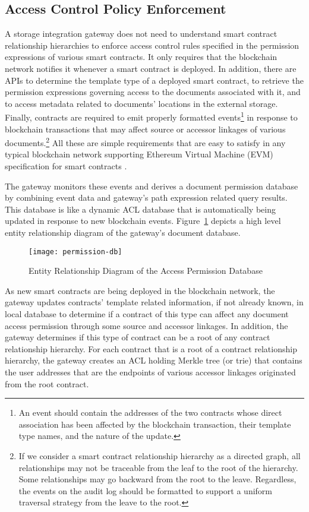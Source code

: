 \subsection{Access Control Policy Enforcement}
A storage integration gateway does not need to understand smart contract relationship hierarchies to enforce access control rules specified in the permission expressions of various smart contracts. It only requires that the blockchain network notifies it whenever a smart contract is deployed. In addition, there are APIs to determine the template type of a deployed smart contract, to retrieve the permission expressions governing access to the documents associated with it, and to access metadata related to documents' locations in the external storage. Finally, contracts are required to emit properly formatted events\footnote{An event should contain the addresses of the two contracts whose direct association has been affected by the blockchain transaction, their template type names, and the nature of the update.} in response to blockchain transactions that may affect source or accessor linkages of various documents.\footnote{If we consider a smart contract relationship hierarchy as a directed graph, all relationships may not be traceable from the leaf to the root of the hierarchy. Some relationships may go backward from the root to the leave. Regardless, the events on the audit log should be formatted to support a uniform traversal strategy from the leave to the root.} All these are simple requirements that are easy to satisfy in any typical blockchain network supporting Ethereum Virtual Machine (EVM) specification for smart contracts \cite{Wood2014EthereumAS}.

The gateway monitors these events and derives a document permission database by combining event data and gateway's path expression related query results. This database is like a dynamic ACL database that is automatically being updated in response to new blockchain events. Figure~\ref{fig:perm-ERD} depicts a high level entity relationship diagram of the gateway's document database.
\begin{figure}[h]
\centering
\texttt{[image: permission-db]}                    
\caption{Entity Relationship Diagram of the Access Permission Database}\label{fig:perm-ERD}
\end{figure}
       
As new smart contracts are being deployed in the blockchain network, the gateway updates contracts' template related information, if not already known, in local database to determine if a contract of this type can affect any document access permission through some source and accessor linkages. In addition, the gateway determines if this type of contract can be a root of any contract relationship hierarchy. For each contract that is a root of a contract relationship hierarchy, the gateway creates an ACL holding Merkle tree (or trie) \cite{6233691} that contains the user addresses that are the endpoints of various accessor linkages originated from the root contract.

